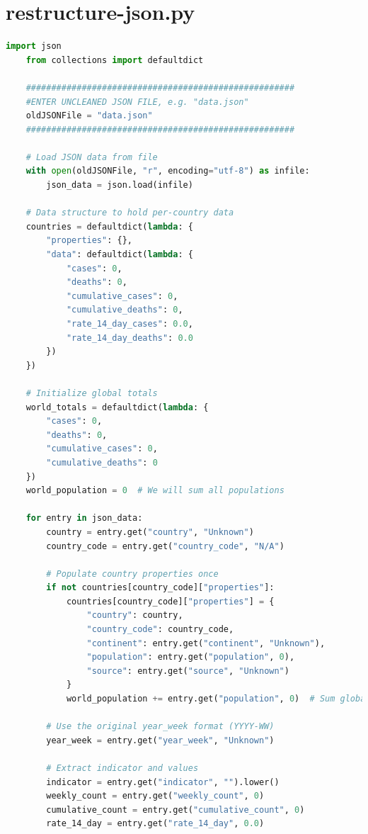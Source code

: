\documentclass{report}
\begin{document}
\section{restructure-json.py}
\begin{lstlisting}[language=Python]
    import json
    from collections import defaultdict
    
    #####################################################
    #ENTER UNCLEANED JSON FILE, e.g. "data.json"
    oldJSONFile = "data.json"
    #####################################################
    
    # Load JSON data from file
    with open(oldJSONFile, "r", encoding="utf-8") as infile:
        json_data = json.load(infile)
    
    # Data structure to hold per-country data
    countries = defaultdict(lambda: {
        "properties": {},
        "data": defaultdict(lambda: {
            "cases": 0,
            "deaths": 0,
            "cumulative_cases": 0,
            "cumulative_deaths": 0,
            "rate_14_day_cases": 0.0,
            "rate_14_day_deaths": 0.0
        })
    })
    
    # Initialize global totals
    world_totals = defaultdict(lambda: {
        "cases": 0,
        "deaths": 0,
        "cumulative_cases": 0,
        "cumulative_deaths": 0
    })
    world_population = 0  # We will sum all populations
    
    for entry in json_data:
        country = entry.get("country", "Unknown")
        country_code = entry.get("country_code", "N/A")
        
        # Populate country properties once
        if not countries[country_code]["properties"]:
            countries[country_code]["properties"] = {
                "country": country,
                "country_code": country_code,
                "continent": entry.get("continent", "Unknown"),
                "population": entry.get("population", 0),
                "source": entry.get("source", "Unknown")
            }
            world_population += entry.get("population", 0)  # Sum global population
    
        # Use the original year_week format (YYYY-WW)
        year_week = entry.get("year_week", "Unknown")
    
        # Extract indicator and values
        indicator = entry.get("indicator", "").lower()
        weekly_count = entry.get("weekly_count", 0)
        cumulative_count = entry.get("cumulative_count", 0)
        rate_14_day = entry.get("rate_14_day", 0.0)
    

\end{lstlisting}
\end{document}
